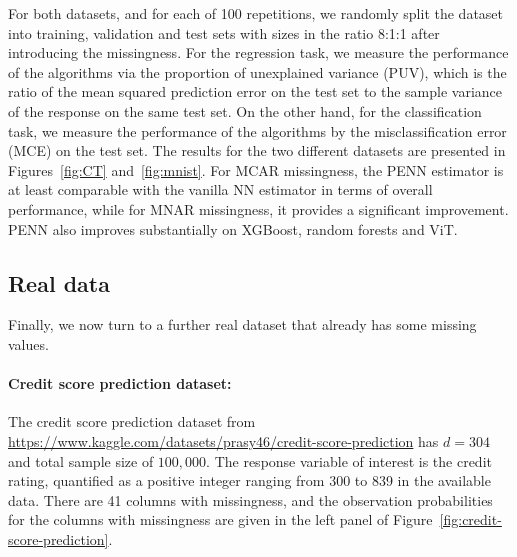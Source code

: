 \documentclass[12pt]{article}
\newcommand{\red}[1]{\textcolor{red}{#1}}
\begin{document}
For both datasets, and for each of 100 repetitions, we randomly split the dataset into training, validation and test sets with sizes in the ratio 8:1:1 after introducing the missingness.  For the regression task, we measure the performance of the algorithms via the proportion of unexplained variance (PUV), which is the ratio of the mean squared prediction error on the test set to the sample variance of the response on the same test set.
On the other hand, for the classification task, we measure the performance of the algorithms by the misclassification error (MCE) on the test set. 
The results for the two different datasets are presented in Figures~\ref{fig:CT} and~\ref{fig:mnist}.  For MCAR missingness, the PENN estimator is at least comparable with the vanilla NN estimator in terms of overall performance, while for MNAR missingness, it provides a significant improvement.  PENN also improves substantially on XGBoost, random forests and ViT.

\subsection{Real data}

Finally, we now turn to a further real dataset that already has some missing values.

 \paragraph{Credit score prediction dataset:}  The credit score prediction dataset from \url{https://www.kaggle.com/datasets/prasy46/credit-score-prediction} has $d=304$ and total sample size of $100{,}000$.  The response variable of interest is the credit rating, quantified as a positive integer ranging from 300 to 839 in the available data.  There are 41 columns with missingness, and the observation probabilities for the columns with missingness are given in the left panel of Figure~\ref{fig:credit-score-prediction}.

\end{document}
